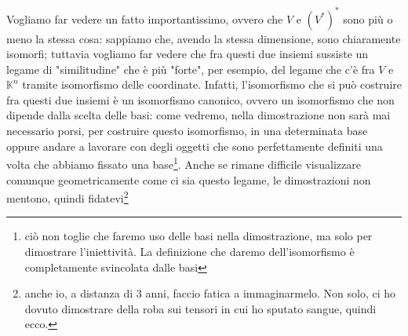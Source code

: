 Vogliamo far vedere un fatto importantissimo, ovvero che $V$ e $(V^*)^*$ sono più o meno la stessa cosa: sappiamo che, avendo la stessa dimensione, sono chiaramente isomorfi; tuttavia vogliamo far vedere che fra questi due insiemi sussiste un legame di "similitudine" che è più "forte", per esempio, del legame che c'è fra $V$ e $\mathbb{K}^n$ tramite isomorfismo delle coordinate. Infatti, l'isomorfismo che si 
può costruire fra questi due insiemi è un isomorfismo canonico, ovvero un isomorfismo che non dipende dalla scelta delle basi: come vedremo, nella dimostrazione non sarà mai necessario porsi, per costruire questo isomorfismo, in una determinata base oppure andare a lavorare con degli oggetti che sono perfettamente definiti una volta che abbiamo fissato una base\footnote{ciò non toglie che faremo uso delle basi nella dimostrazione, ma solo per dimostrare l'iniettività. La definizione che daremo dell'isomorfismo è completamente svincolata dalle basi}. 
Anche se rimane difficile visualizzare comunque geometricamente come ci sia questo legame, le dimostrazioni non mentono, quindi fidatevi\footnote{anche io, a distanza di $3$ anni, faccio fatica a immaginarmelo. Non solo, ci ho dovuto dimostrare della roba sui tensori in cui ho sputato sangue, quindi ecco.}

